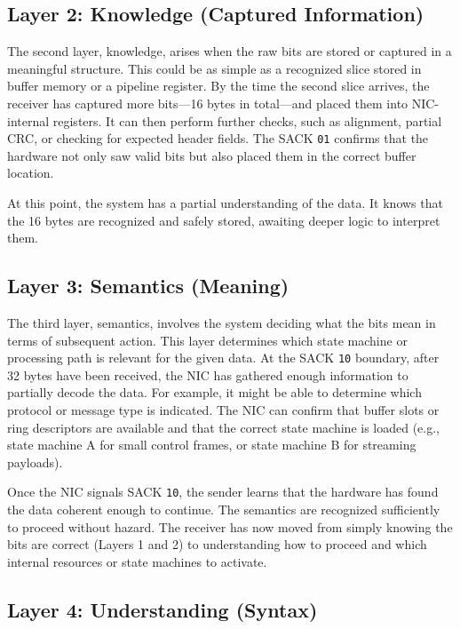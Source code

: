 \subsection{Layer 2: Knowledge (Captured Information)}

The second layer, knowledge, arises when the raw bits are stored or captured in a meaningful structure. This could be as simple as a recognized slice stored in buffer memory or a pipeline register. By the time the second slice arrives, the receiver has captured more bits—16 bytes in total—and placed them into NIC-internal registers. It can then perform further checks, such as alignment, partial CRC, or checking for expected header fields. The SACK \texttt{01} confirms that the hardware not only saw valid bits but also placed them in the correct buffer location.

At this point, the system has a partial understanding of the data. It knows that the 16 bytes are recognized and safely stored, awaiting deeper logic to interpret them.

\subsection{Layer 3: Semantics (Meaning)}

The third layer, semantics, involves the system deciding what the bits mean in terms of subsequent action. This layer determines which state machine or processing path is relevant for the given data. At the SACK \texttt{10} boundary, after 32 bytes have been received, the NIC has gathered enough information to partially decode the data. For example, it might be able to determine which protocol or message type is indicated. The NIC can confirm that buffer slots or ring descriptors are available and that the correct state machine is loaded (e.g., state machine A for small control frames, or state machine B for streaming payloads).

Once the NIC signals SACK \texttt{10}, the sender learns that the hardware has found the data coherent enough to continue. The semantics are recognized sufficiently to proceed without hazard. The receiver has now moved from simply knowing the bits are correct (Layers 1 and 2) to understanding how to proceed and which internal resources or state machines to activate.

\subsection{Layer 4: Understanding (Syntax)}

